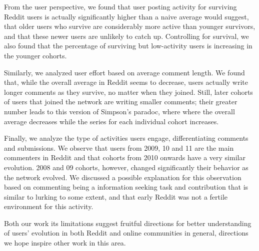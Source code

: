 From the user perspective, we found that user posting activity for surviving Reddit users is actually significantly higher than a naive average would suggest, that older users who survive are considerably more active than younger survivors, and that these newer users are unlikely to catch up.   Controlling for survival, we also found that the percentage of surviving but low-activity users is increasing in the younger cohorts.  %

Similarly, we analyzed user effort based on average comment length. We found that, while the overall average in Reddit seems to decrease, users actually write longer comments as they survive, no matter when they joined.  Still, later cohorts of users that joined the network are writing smaller comments; their greater number leads to this version of Simpson's paradoc, where where the overall average decreases while the series for each individual cohort increases. 

Finally, we analyze the type of activities users engage, differentiating comments and submissions. We observe that users from 2009, 10 and 11 are the main commenters in Reddit and that cohorts from 2010 onwards have a very similar evolution. 2008 and 09 cohorts, however, changed significantly their behavior as the network evolved.  We discussed a possible explanation for this observation based on commenting being a information seeking task and contribution  that is similar to lurking to some extent, and that early Reddit was not a fertile environment for this activity.

Both our work its limitations suggest fruitful directions for better understanding of users' evolution in both Reddit and online communities in general, directions we hope inspire other work in this area.  